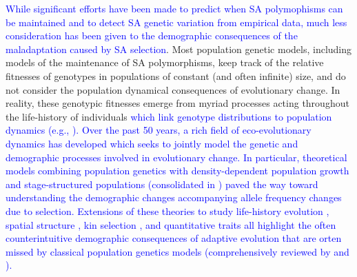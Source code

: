 \documentclass[11pt]{article}
\begin{document}
\textcolor{blue}{While significant efforts have been made to predict when SA polymophisms can be maintained and to detect SA genetic variation from empirical data, much less consideration has been given to the demographic consequences of the maladaptation caused by SA selection}. Most population genetic models, including models of the maintenance of SA polymorphisms, keep track of the relative fitnesses of genotypes in populations of constant (and often infinite) size, and do not consider the population dynamical consequences of evolutionary change. In reality, these genotypic fitnesses emerge from myriad processes acting throughout the life-history of individuals \textcolor{blue}{which link genotype distributions to population dynamics (e.g., \citealt {johnston2013life, merot2020balancing}). Over the past 50 years, a rich field of eco-evolutionary dynamics has developed which seeks to jointly model the genetic and demographic processes involved in evolutionary change. In particular, theoretical models combining population genetics with density-dependent population growth \citep{roughgarden1971density} and stage-structured populations (consolidated in \citealt{Charlesworth_1994}) paved the way toward understanding the demographic changes accompanying allele frequency changes due to selection. Extensions of these theories to study life-history evolution \citep{orive1995senescence, orive2001somatic}, spatial structure \citep{ronce2000kin}, kin selection \citep{rousset2004genetic}, and quantitative traits \citep[e.g.,][]{coulson2006putting, barfield2011evolution, childs2016evolution, orive2017effects} all highlight the often counterintuitive demographic consequences of adaptive evolution that are orten missed by classical population genetics models (comprehensively reviewed by \citealt{fussmann2007eco} and \citealt{govaert2019eco}).}



  
\end{document}
